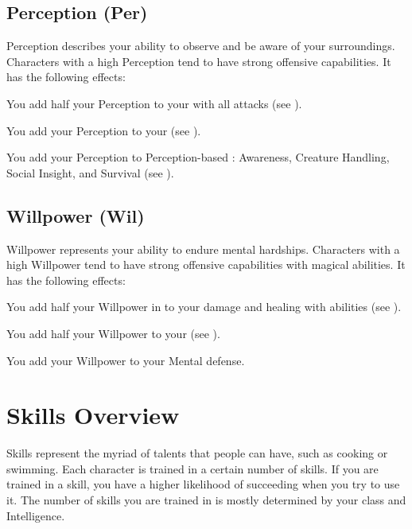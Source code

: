     \subsection{Perception (Per)}\label{Perception}
        {
            Perception describes your ability to observe and be aware of your surroundings.
            Characters with a high Perception tend to have strong offensive capabilities.
            It has the following effects:
            \begin{raggeditemize}
                \item You add half your Perception to your  with all attacks (see ).
                \item You add your Perception to your  (see ).
                \item You add your Perception to Perception-based : Awareness, Creature Handling, Social Insight, and Survival (see ).
            \end{raggeditemize}
        }

    \subsection{Willpower (Wil)}\label{Willpower}
        {
            Willpower represents your ability to endure mental hardships.
            Characters with a high Willpower tend to have strong offensive capabilities with magical abilities.
            It has the following effects:
            \begin{raggeditemize}
                \item You add half your Willpower in  to your damage and healing with  abilities (see ).
                \item You add half your Willpower to your  (see ).
                \item You add your Willpower to your Mental defense.
            \end{raggeditemize}
        }

\section{Skills Overview}
    Skills represent the myriad of talents that people can have, such as cooking or swimming.
    Each character is trained in a certain number of skills.
    If you are trained in a skill, you have a higher likelihood of succeeding when you try to use it.
    The number of skills you are trained in is mostly determined by your class and Intelligence.


